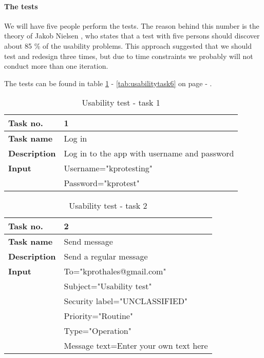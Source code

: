 \paragraph{The tests}\hfill
\newline
We will have five people perform the tests. The reason behind this number is the theory of Jakob Nielsen \cite{bib:useit}, who states that a test with five persons should discover about 85 \% of the usability problems. This approach suggested that we should test and redesign three times, but due to time constraints we probably will not conduct more than one iteration.  
\newline

The tests can be found in table \ref{tab:usabilitytask1} - \ref{tab:usabilitytask6} on page \pageref{tab:usabilitytask1} - \pageref{tab:usabilitytask6}.

\begin{table}[h!]
\begin{center}
\begin{tabular}{>{\bfseries}l|l} \hline
Task no.&1\\ \hline
Task name&Log in\\ \hline
Description&Log in to the app with username and password\\ \hline
Input&Username="kprotesting" \\
&Password="kprotest"\\ \hline
\end{tabular}
\end{center}
\caption{Usability test - task 1} \label{tab:usabilitytask1}
\end{table}

\begin{table}[h!]
\begin{center}
\begin{tabular}{>{\bfseries}l|l}\hline
Task no.&2\\ \hline
Task name&Send message\\ \hline
Description&Send a regular message\\ \hline
Input&To="kprothales@gmail.com" \\
&Subject="Usability test"\\
&Security label="UNCLASSIFIED"\\ 
&Priority="Routine"\\
&Type="Operation"\\
&Message text=Enter your own text here\\ \hline
\end{tabular}
\end{center}
\caption{Usability test - task 2} \label{tab:usabilitytask2}
\end{table}

